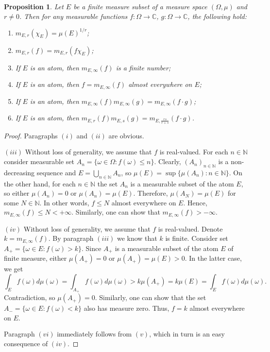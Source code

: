 \documentclass[12pt]{article}
\newtheorem{proposition}[theorem]{Proposition}
\begin{document}
\begin{proposition}\label{GnrlzdMeanProp}
    Let $E$ be a finite measure subset of a measure space $(\Omega,\mu)$ 
    and $r\neq 0$. Then for any measurable 
    functions $f:\Omega\to\mathbb{C}$, $g:\Omega\to\mathbb{C}$, the following 
    hold:
    \begin{enumerate}[label = (\roman*)]
        \item $m_{E,r}(\chi_E)=\mu(E)^{1/r}$;
        \item $m_{E,r}(f)=m_{E,r}(f\chi_E)$;
        \item If $E$ is an atom, then $m_{E,\infty}(f)$ is a finite number;
        \item If $E$ is an atom, then $f=m_{E,\infty}(f)$ almost 
        everywhere on $E$;
        \item If $E$ is an atom, 
        then $m_{E,\infty}(f)m_{E,\infty}(g)=m_{E,\infty}(f\cdot g)$;
        \item If $E$ is an atom, 
        then $m_{E,r}(f)m_{E,s}(g)=m_{E,\frac{rs}{r+s}}(f\cdot g)$.
    \end{enumerate}
\end{proposition}
\begin{proof}
    Paragraphs $(i)$ and $(ii)$ are obvious.

    $(iii)$ Without loss of generality, we assume that $f$ is real-valued.
    For each $n\in\mathbb{N}$ consider measurable 
    set $A_n=\{\omega\in\Omega:f(\omega)\leq n\}$. Clearly, 
    $(A_n)_{n\in\mathbb{N}}$ is a non-decreasing sequence 
    and $E=\bigcup_{n\in\mathbb{N}}A_n$, 
    so $\mu(E)=\sup\{\mu(A_n):n\in\mathbb{N}\}$. On the other hand, for 
    each $n\in\mathbb{N}$ the set $A_n$ is a measurable subset of the atom $E$, 
    so either $\mu(A_n)=0$ or $\mu(A_n)=\mu(E)$. Therefore, $\mu(A_N)=\mu(E)$ for
    some $N\in\mathbb{N}$. In other words, $f\leq N$ almost everywhere on $E$.
    Hence, $m_{E,\infty}(f)\leq N<+\infty$. Similarly, one can show 
    that $m_{E,\infty}(f)>-\infty$.

    $(iv)$ Without loss of generality, we assume that $f$ is real-valued. 
    Denote $k=m_{E,\infty}(f)$. By paragraph $(iii)$ we know that $k$ is finite. 
    Consider set $A_+=\{\omega\in E: f(\omega)>k\}$. Since $A_+$ is a 
    measurable subset of the atom $E$ of finite measure, 
    either $\mu(A_+)=0$ or $\mu(A_+)=\mu(E)>0$. In the latter case, we get 
    \[
        \int_E f(\omega)d\mu(\omega)
        =\int_{A_+}f(\omega)d\mu(\omega)
        >k\mu(A_+)
        =k\mu(E)
        =\int_E f(\omega)d\mu(\omega).
    \]
    Contradiction, so $\mu(A_+)=0$. Similarly, one can show that the 
    set $A_-=\{\omega\in E:f(\omega)<k\}$ also has measure zero. Thus, $f=k$ 
    almost everywhere on $E$.

    Paragraph $(vi)$ immediately follows from $(v)$, which in turn is an easy 
    consequence of $(iv)$.
\end{proof}
\end{document}
